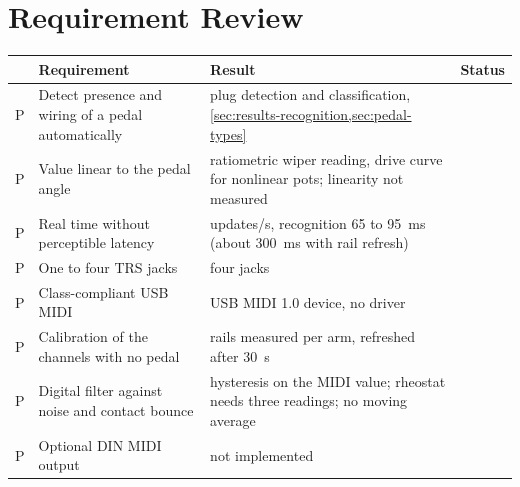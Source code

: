 
\section{Requirement Review}
\label{sec:results-requirements}


\begin{table}[htbp]
  \centering
  \small
  \label{tab:requirements}
  \begin{tabularx}{\linewidth}{@{}l >{\raggedright\arraybackslash}X >{\raggedright\arraybackslash}X l@{}}
    \toprule
    & \textbf{Requirement} & \textbf{Result} & \textbf{Status} \\
    \midrule
    P & Detect presence and wiring of a pedal automatically & plug detection and classification, \cref{sec:results-recognition,sec:pedal-types} & \scaffoldinline{?} \\
    P & Value linear to the pedal angle & ratiometric wiper reading, drive curve for nonlinear pots; linearity not measured & \scaffoldinline{?} \\
    P & Real time without perceptible latency & 188 updates/s, recognition 65 to \qty{95}{\milli\second} (about \qty{300}{\milli\second} with rail refresh) & \scaffoldinline{?} \\
    P & One to four TRS jacks & four jacks & \scaffoldinline{?} \\
    P & Class-compliant USB MIDI & USB MIDI 1.0 device, no driver & \scaffoldinline{?} \\
    P & Calibration of the channels with no pedal & rails measured per arm, refreshed after \qty{30}{\second} & \scaffoldinline{?} \\
    P & Digital filter against noise and contact bounce & hysteresis on the MIDI value; rheostat needs three readings; no moving average & \scaffoldinline{?} \\
    P & Optional DIN MIDI output & not implemented & \scaffoldinline{?} \\

\end{tabularx}
\end{table}
